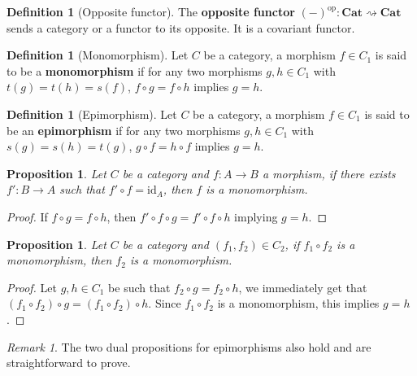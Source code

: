 \documentclass{scrartcl}
\newtheorem{prop}[thm]{Proposition}
\theoremstyle{definition}
\newtheorem{defn}[thm]{Definition}
\theoremstyle{remark}
\newtheorem{rem}[thm]{Remark}
\newcommand{\id}{\text{id}}
\newcommand{\op}[1]{#1^{\text{op}}}
\begin{document}
\begin{defn}[Opposite functor]
    The \textbf{opposite functor} $\op{(-)}:\textbf{Cat} \rightsquigarrow \textbf{Cat}$ sends a category or a functor to its opposite. It is a covariant functor.
\end{defn}
\begin{defn}[Monomorphism]
    Let $C$ be a category, a morphism $f \in C_1$ is said to be a \textbf{monomorphism} if for any two morphisms $g,h \in C_1$ with $t(g) = t(h) = s(f)$, $f \circ g = f\circ h$ implies $g = h$.
\end{defn}
\begin{defn}[Epimorphism]
    Let $C$ be a category, a morphism $f \in C_1$ is said to be an \textbf{epimorphism} if for any two morphisms $g,h \in C_1$ with $s(g) = s(h) = t(g)$, $g\circ f = h\circ f$ implies $g = h$.
\end{defn}
\begin{prop}
Let $C$ be a category and $f:A\rightarrow B$ a morphism, if there exists $f': B\rightarrow A$ such that $f'\circ f = \id_A$, then $f$ is a monomorphism.
\end{prop}
\begin{proof}
If $f\circ g = f\circ h$, then $f'\circ f \circ g = f'\circ f \circ h$ implying $g = h$.
\end{proof}
\begin{prop}
Let $C$ be a category and $(f_1, f_2) \in C_2$, if $f_1 \circ f_2$ is a monomorphism, then $f_2$ is a monomorphism.
\end{prop}
\begin{proof}
Let $g,h \in C_1$ be such that $f_2\circ g = f_2\circ h$, we immediately get that $(f_1\circ f_2)\circ g = (f_1 \circ f_2) \circ h$. Since $f_1\circ f_2$ is a monomorphism, this implies $g = h$.
\end{proof}
\begin{rem}
    The two dual propositions for epimorphisms also hold and are straightforward to prove.
\end{rem}
\end{document}
